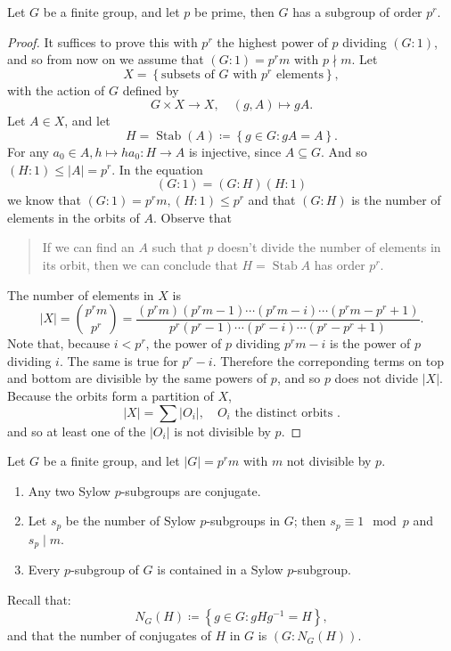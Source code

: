 \begin{theorem}[Sylow I]
  Let \( G \) be a finite group, and let \( p \) be prime, then \( G \) has a subgroup of order \( p^r \).
\end{theorem}
\begin{proof}
  It suffices to prove this with \( p^r \) the highest power of \( p \) dividing \( (G : 1) \), and so from now on we assume that \( (G: 1) = p^r m \) with \( p \nmid m \).
  Let
  \[
    X = \left\lbrace \text{subsets of } G \text{ with } p^r \text{ elements} \right\rbrace,
  \]
  with the action of \( G \) defined by
  \[
    G \times X \to X,\quad (g, A) \mapsto gA.
  \]
  Let \( A \in X \), and let
  \[
    H = \operatorname{Stab}(A) \coloneq \left\lbrace g \in G: gA = A \right\rbrace.
  \]
  For any \( a_0 \in A, h \mapsto h a_0: H \to A \) is injective, since \( A \subseteq G \).
  And so \( (H : 1) \leq \left\vert A \right\vert = p^r \).
  In the equation
  \[
    (G : 1) = (G : H)(H : 1)
  \]
  we know that \( (G : 1) = p^r m, (H : 1) \leq p^r \) and that \( (G : H) \) is the number of elements in the orbits of \( A \).
  Observe that
  \begin{quote}
    If we can find an \( A \) such that \( p \) doesn't divide the number of elements in its orbit, then we can conclude that \( H = \operatorname{Stab}A \) has order \( p^r \).
  \end{quote}
  The number of elements in \( X \) is
  \[
    \left\vert X \right\vert = \binom{p^rm}{p^r} = \frac{(p^rm)(p^r m - 1) \cdots (p^rm- i) \cdots (p^rm - p^r + 1)}{p^r(p^r - 1) \cdots (p^r - i)\cdots (p^r - p^r + 1)}.
  \]
  Note that, because \( i < p^r \), the power of \( p \) dividing \( p^r m - i \) is the power of \( p \) dividing \( i \).
  The same is true for \( p^r - i \).
  Therefore the correponding terms on top and bottom are divisible by the same powers of \( p \), and so \( p \) does not divide \( \left\vert X \right\vert \).
  Because the orbits form a partition of \( X \),
  \[
    \left\vert X \right\vert = \sum \left\vert O_i \right\vert, \quad O_i\text{ the distinct orbits }.
  \]
  and so at least one of the \( \left\vert O_i \right\vert \) is not divisible by \( p \).
\end{proof}

\begin{theorem}[Sylow II]
  Let \( G \) be a finite group, and let \( \left\vert G \right\vert = p^r m \) with \( m \) not divisible by \( p \).
  \begin{enumerate}
    \item Any two Sylow \( p \)-subgroups are conjugate.
    \item Let \( s_p \) be the number of Sylow \( p \)-subgroups in \( G \);
      then \( s_p \equiv 1 \mod{p} \) and \( s_p \mid m \).
    \item Every \( p \)-subgroup of \( G \) is contained in a Sylow \( p \)-subgroup.
  \end{enumerate}
\end{theorem}
Recall that:
\[
  N_G(H) \coloneq \left\lbrace g \in G: g H g^{-1} = H \right\rbrace,
\]
and that the number of conjugates of \( H \) in \( G \) is \( (G: N_G(H)) \).

